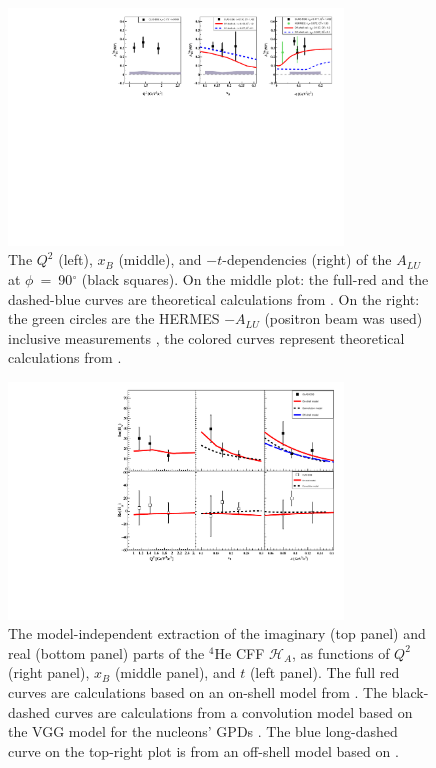 \documentclass[nofootinbib,twocolumn,showpacs,prl,superscriptaddress,secnumarabic,amssymb,nobibnotes,aps,floatfix,preprint]{revtex4}
\begin{document}
\begin{figure}[tb]
\includegraphics[width=8.9cm]{figs/coherent-ALU_90.pdf}
\caption{The $Q^{2}$ (left), $x_{B}$ (middle), and $-t$-dependencies (right) of
   the $A_{LU}$ at $\phi$~=~90$^{\circ}$ (black squares). On the 
   middle plot: the full-red and the dashed-blue curves are theoretical 
   calculations from \cite{simonetta_2}. On the right: the green circles are 
   the HERMES $-A_{LU}$ (positron beam was used) inclusive measurements 
   \cite{HERMES_BSA}, the colored curves represent theoretical calculations 
   from \cite{simonetta_2}.}
\label{fig:alu90}
\end{figure}


\begin{figure}[tb]
\includegraphics[width=8.9cm]{figs/Coherent_CFF.pdf}
\caption{The model-independent extraction of the imaginary (top panel) and
real (bottom panel) parts of the $^4$He CFF $\mathcal{H}_A$, as functions of
$Q^{2}$ (right panel), $x_B$ (middle panel), and $t$ (left panel). The full red 
curves are calculations based on an on-shell model from
\cite{Vadim_priv}. The black-dashed curves are calculations from a convolution 
model based on the VGG model for the nucleons' GPDs \cite{Guidal_priv}. The 
blue long-dashed curve on the top-right plot is from
an off-shell model based on \cite{GonzalezHernandez:2012jv}.}
\label{fig:CFF_HA}
\end{figure}
\end{document}
